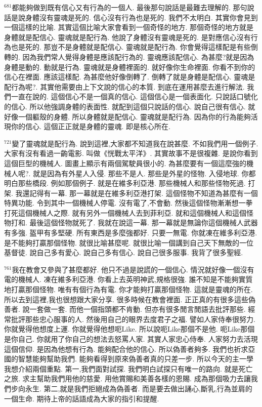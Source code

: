 \documentclass{book}
\begin{document}
$^{681}$都能夠做到既有信心又有行為的一個人.
最後那句說話是最難去理解的.
那句說話是說身體沒有靈魂是死的.
信心沒有行為也是死的.
我們不太明白.
其實你會見到一個這樣的比喻.
其實這個比喻大家會看到一個奇怪的地方.
那個奇怪的地方就是身體就是配信心.
靈魂就是配行為.
他說了身體沒有靈魂是死的.
是對應信心沒有行為也是死的.
那豈不是身體就是配信心.
靈魂就是配行為.
你會覺得這樣配是有些倒轉的.
因為我們常人覺得身體是應該配行為的.
靈魂應該配信心.
為甚麼?就是因為身體是動的.
動就是行為.
靈魂就是身體裡面的.
就好像你生命裡面.
你看不到你的信心在裡面.
應該這樣配.
為甚麼他好像倒轉了.
倒轉了就是身體是配信心.
靈魂是配行為呢?.
其實他需要由上下文說的信心的本質.
到底在運用甚麼去進行解法.
我們一直在說的.
這個信心不是一個真的信心.
這個信心是一個表面化.
只說話口號化的信心.
所以他強調身體的表面性.
就配到這個只說話的信心.
說自己很有信心.
就好像一個軀殼的身體.
所以身體就是配信心.
靈魂就是配行為.
因為你的行為能夠活現你的信心.
這個正正就是身體的靈魂.
即是核心所在.

$^{721}$變了靈魂就是配行為.
說到這裡,大家都不知道我在說甚麼.
不如我們用一個例子.
大家有沒有看過一齣電影.
叫做《恍戰太平洋》.
其實故事不是很複雜.
是說你看到這個巨型的機械人.
圖畫上顯示有兩個駕駛員很小的.
為甚麼要有一個這麼強的機械人呢?.
就是因為有外星人入侵.
那些不是人.
那些是外星的怪物.
入侵地球.
你都明白那些橋段.
例如那個例子.
就是在維多利亞港.
那些機械人和那些怪物死過.
打架.
我還記得有一幕.
那一幕就是在維多利亞港打架.
這個怪物不知道為甚麼有一個特異功能.
令到其中一個機械人停電.
沒有電了,不會動.
然後這個怪物漸漸想一拳打死這個機械人之際.
就有另外一個機械人去到菲利亞.
就和這個機械人和這個怪物打和.
最後這個怪物就死了.
我就在說這一幕.
那一幕就是無論你這個機械人武器有多強.
盔甲有多堅硬.
所有東西是多麼強都好.
只要一無電.
你就凍在維多利亞港.
是不能夠打贏那個怪物.
就很比喻甚麼呢.
就很比喻一個講到自己天下無敵的一位基督徒.
說自己多有愛心.
說自己多有信心.
說自己很多服事.
我背了很多聖經.

$^{761}$我在教會又參與了甚麼都好.
他只不過是說謊的一個信心.
情況就好像一個沒有電的機械人.
凍在維多利亞港.
你看上去英明神武,規格很強.
誰不知是不能夠實質地打贏那個怪物.
唯有有個行為有電.
你才能夠打贏那個怪物.
這就是靈魂的所在.
所以去到這裡,我也很想跟大家分享.
很多時候在教會裡面.
正正真的有很多這些偽善者.
說一套做一套.
而他一個指頭都不肯動.
但亦有很多閒言閒語去批評那些.
經常批評那些忠心服事的人.
然後用自己的眼界去度君子之福.
譬如人家侍奉很努力.
你就覺得他想度上運.
你就覺得他想呃Like.
所以說呃Like那個不是他.
呃Like那個是你自己.
你就用了你自己的想法去怒罵人家.
其實人家忠心侍奉.
人家努力去活現這個信仰.
是因為他想有行為.
能夠配合他的信心.
所以偽善者夠多.
我們也祈求亞國的智慧能夠幫助我們.
能夠看得到原來偽善者真的只差一步.
所以今天的主一學我想介紹兩個重點.
第一,我們面對試探.
我們明白試探只有唯一的路向.
就是死亡之旅.
求主幫助我們用他的慈愛.
用他賞賜和美善各樣的恩賜.
成為那個吸力去讓我們步向永生.
第二,就是我們拒絕成為偽善者.
而是要去做出誦心,斷乳,行為並肩的一個生命.
期待上帝的話語成為大家的指引和提醒.
\end{document}
